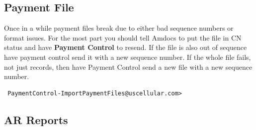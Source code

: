 \documentclass[12pt,twoside]{article}
\begin{document}
\subsection{Payment File}
\label{sec-11-4}

   Once in a while payment files break due to either bad sequence numbers or format issues. For the most part you should tell Amdocs to put the file in CN status and have \textbf{Payment Control} to resend.
   If the file is also out of sequence have payment control send it with a new sequence number. If the whole file fails, not just records, then have Payment Control send a new file with a new sequence number.
\begin{verbatim}
 PaymentControl-ImportPaymentFiles@uscellular.com>
\end{verbatim}
\subsection{AR Reports}
\label{sec-11-5}
\end{document}
